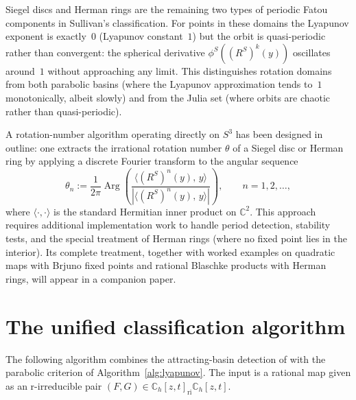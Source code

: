 \documentclass[12pt]{article}
\theoremstyle{definition}
\newcommand{\C}{\mathbb{C}}
\newcommand{\RS}{R^S}
\DeclareMathOperator{\Arg}{Arg}
\begin{document}
Siegel discs and Herman rings are the remaining two types of periodic Fatou
components in Sullivan's classification.  For points in these domains the
Lyapunov exponent is exactly~$0$ (Lyapunov constant~$1$) but the orbit is
quasi-periodic rather than convergent: the spherical derivative
$\phi^S((\RS)^k(y))$ oscillates around~$1$ without approaching any limit.
This distinguishes rotation domains from both parabolic basins (where the
Lyapunov approximation tends to~$1$ monotonically, albeit slowly) and from
the Julia set (where orbits are chaotic rather than quasi-periodic).

A rotation-number algorithm operating directly on $S^3$ has been designed
in outline: one extracts the irrational rotation number $\theta$ of a
Siegel disc or Herman ring by applying a discrete Fourier transform to the
angular sequence
\[
  \theta_n := \frac{1}{2\pi}\Arg\!\left(\frac{\langle (\RS)^n(y),\, y\rangle}
  {|\langle (\RS)^n(y),\, y\rangle|}\right), \qquad n = 1, 2, \ldots,
\]
where $\langle\cdot,\cdot\rangle$ is the standard Hermitian inner product
on $\C^2$.  This approach requires additional implementation work to handle
period detection, stability tests, and the special treatment of Herman rings
(where no fixed point lies in the interior).  Its complete treatment,
together with worked examples on quadratic maps with Brjuno fixed points
and rational Blaschke products with Herman rings, will appear in a companion
paper.

\section{The unified classification algorithm}
\label{sec:algorithm}

The following algorithm combines the attracting-basin detection of
\cite{Alvarez2023} with the parabolic criterion of
Algorithm~\ref{alg:lyapunov}.  The input is a rational map given as an
r-irreducible pair $(F,G) \in \C_h[z,t]_{\mathrm{ri}}\C_h[z,t]$.
\end{document}
